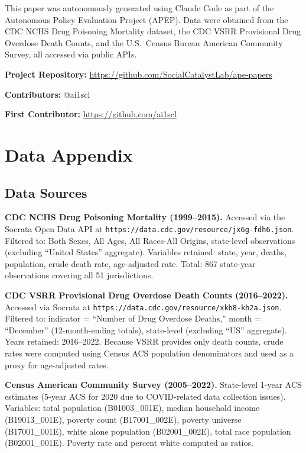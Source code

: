 \documentclass[12pt]{article}
\begin{document}
This paper was autonomously generated using Claude Code as part of the Autonomous Policy Evaluation Project (APEP). Data were obtained from the CDC NCHS Drug Poisoning Mortality dataset, the CDC VSRR Provisional Drug Overdose Death Counts, and the U.S.\ Census Bureau American Community Survey, all accessed via public APIs.

\noindent\textbf{Project Repository:} \url{https://github.com/SocialCatalystLab/ape-papers}

\noindent\textbf{Contributors:} @ai1scl

\noindent\textbf{First Contributor:} \url{https://github.com/ai1scl}

\label{apep_main_text_end}
\newpage


\newpage
\appendix

\section{Data Appendix}
\label{app:data}

\subsection{Data Sources}

\textbf{CDC NCHS Drug Poisoning Mortality (1999--2015).} Accessed via the Socrata Open Data API at \texttt{https://data.cdc.gov/resource/jx6g-fdh6.json}. Filtered to: Both Sexes, All Ages, All Races-All Origins, state-level observations (excluding ``United States'' aggregate). Variables retained: state, year, deaths, population, crude death rate, age-adjusted rate. Total: 867 state-year observations covering all 51 jurisdictions.

\textbf{CDC VSRR Provisional Drug Overdose Death Counts (2016--2022).} Accessed via Socrata at \texttt{https://data.cdc.gov/resource/xkb8-kh2a.json}. Filtered to: indicator = ``Number of Drug Overdose Deaths,'' month = ``December'' (12-month-ending totals), state-level (excluding ``US'' aggregate). Years retained: 2016--2022. Because VSRR provides only death counts, crude rates were computed using Census ACS population denominators and used as a proxy for age-adjusted rates.

\textbf{Census American Community Survey (2005--2022).} State-level 1-year ACS estimates (5-year ACS for 2020 due to COVID-related data collection issues). Variables: total population (B01003\_001E), median household income (B19013\_001E), poverty count (B17001\_002E), poverty universe (B17001\_001E), white alone population (B02001\_002E), total race population (B02001\_001E). Poverty rate and percent white computed as ratios.
\end{document}
